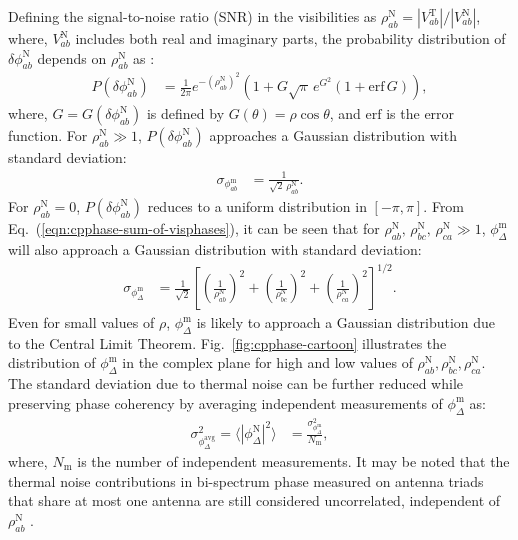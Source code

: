 \documentclass[
reprint,
superscriptaddress,
amsmath,
amssymb,
aps,
prd
]{revtex4-1}
\begin{document}
Defining the signal-to-noise ratio (SNR) in the visibilities as $\rho_{ab}^\textrm{N} = |V_{ab}^\textrm{T}|/|V_{ab}^\textrm{N}|$, where, $V_{ab}^\textrm{N}$ includes both real and imaginary parts, the probability distribution of $\delta\phi_{ab}^\textrm{N}$ depends on $\rho_{ab}^\textrm{N}$ as \cite{cra89}:
\begin{align}
  P(\delta\phi_{ab}^\textrm{N}) &= \frac{1}{2\pi} e^{-(\rho_{ab}^\textrm{N})^2} \left(1 + G\sqrt{\pi}\,e^{G^2}(1+\mathrm{erf}\,G)\right),
\end{align}
where, $G=G(\delta\phi_{ab}^\textrm{N})$ is defined by $G(\theta)=\rho\cos\theta$, and $\mathrm{erf}$ is the error function. For $\rho_{ab}^\textrm{N}\gg 1$, $P(\delta\phi_{ab}^\textrm{N})$ approaches a Gaussian distribution with standard deviation:
\begin{align}
  \sigma_{\phi_{ab}^\textrm{m}} &= \frac{1}{\sqrt{2}\,\rho_{ab}^\textrm{N}}.
\end{align}
For $\rho_{ab}^\textrm{N}=0$, $P(\delta\phi_{ab}^\textrm{N})$ reduces to a uniform distribution in $[-\pi,\pi]$. From Eq.~(\ref{eqn:cpphase-sum-of-visphases}), it can be seen that for $\rho_{ab}^\textrm{N},\,\rho_{bc}^\textrm{N},\,\rho_{ca}^\textrm{N}\gg 1$, $\phi_\Delta^\textrm{m}$ will also approach a Gaussian distribution with standard deviation:
\begin{align}
  \sigma_{\phi_\Delta^\textrm{m}} &= \frac{1}{\sqrt{2}}\left[\left(\frac{1}{\rho_{ab}^\textrm{N}}\right)^2 + \left(\frac{1}{\rho_{bc}^\textrm{N}}\right)^2 + \left(\frac{1}{\rho_{ca}^\textrm{N}}\right)^2\right]^{1/2}. \label{eqn:cprms-noise}
\end{align}
Even for small values of $\rho$, $\phi_\Delta^\textrm{m}$ is likely to approach a Gaussian distribution due to the Central Limit Theorem. Fig.~\ref{fig:cpphase-cartoon} illustrates the distribution of $\phi_\Delta^\textrm{m}$ in the complex plane for high and low values of $\rho_{ab}^\textrm{N},\rho_{bc}^\textrm{N},\rho_{ca}^\textrm{N}$. The standard deviation due to thermal noise can be further reduced while preserving phase coherency by averaging independent measurements of $\phi_\Delta^\textrm{m}$ as:
\begin{align}
  \sigma_{\phi_\Delta^\textrm{avg}}^2 = \bigg\langle |\phi_\Delta^\textrm{N}|^2\bigg\rangle &= \frac{\sigma_{\phi_\Delta^\textrm{m}}^2}{N_\textrm{m}},
\end{align}
where, $N_\textrm{m}$ is the number of independent measurements. It may be noted that the thermal noise contributions in bi-spectrum phase measured on antenna triads that share at most one antenna are still considered uncorrelated, independent of $\rho_{ab}^\textrm{N}$ \cite{kul89}.
\end{document}
